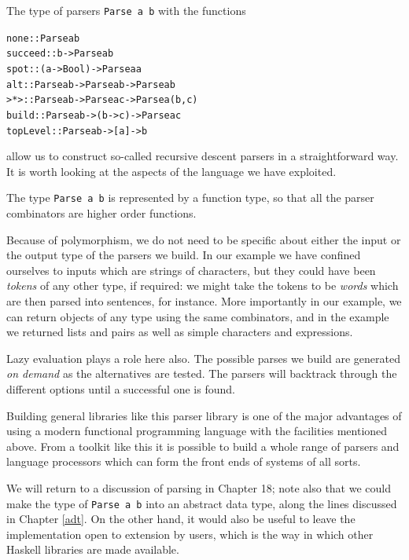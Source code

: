 The type of parsers \texttt{Parse a b} with the functions
\begin{alltt}
none     :: Parse a b
succeed  :: b -> Parse a b 
spot     :: (a -> Bool) -> Parse a a
alt      :: Parse a b -> Parse a b -> Parse a b
>*>      :: Parse a b -> Parse a c -> Parse a (b,c)
build    :: Parse a b -> (b -> c) -> Parse a c
topLevel :: Parse a b -> [a] -> b
\end{alltt}
allow us to construct so-called recursive descent parsers in a
straightforward way. It is worth looking at the aspects of the language we
have exploited.
\begin{titemize}
\item The type \texttt{Parse a b} is represented by a function type, so that
all the parser combinators are higher order functions.
\item Because of polymorphism, we do not need to be specific about
either the input or the output type of the parsers we build. 
\itempar
In our example
we have confined ourselves to inputs which are strings of characters, but
they could have been {\em tokens\/} of any other type, if required: we might
take the tokens to be {\em words\/} which are then parsed into sentences, for
instance. 
\itempar
More importantly in our example, we can return objects of any
type using the same combinators, and in the example we returned lists and
pairs as well as simple characters and expressions.
\item Lazy evaluation plays a role here also. The possible parses we build
are generated {\em on demand\/} as the alternatives are tested. The parsers
will backtrack through the different options until a successful one is found.
\end{titemize}
Building general libraries like this parser library is one of the major
advantages of using a modern functional programming language 
with the facilities mentioned
above. From a
toolkit like this it is possible to build a whole range of parsers and
language processors which can form the front ends of systems of all sorts.

We will return to a discussion of parsing in Chapter 18; note
also that we could make the type of \texttt{Parse a b} into an abstract
data type, along the lines discussed in Chapter \ref{adt}. On the other
hand, it would also be useful to leave the implementation open to
extension by users, which is the way in which other Haskell libraries
are made available.

